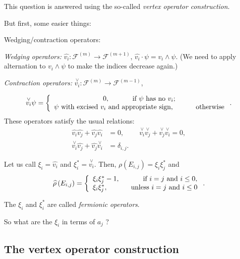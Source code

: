 \documentclass
[numbers=enddot,12pt,final,onecolumn,german,notitlepage]{scrartcl}%
\theoremstyle{definition}
\begin{document}
This question is answered using the so-called \textit{vertex operator
construction}.

But first, some easier things:

Wedging/contraction operators:

\textit{Wedging operators: }$\widehat{v_{i}}:\mathcal{F}^{\left(  m\right)
}\rightarrow\mathcal{F}^{\left(  m+1\right)  }$, $\widehat{v_{i}}\cdot
\psi=v_{i}\wedge\psi$. (We need to apply alternation to $v_{i}\wedge\psi$ to
make the indices decrease again.)

\textit{Contraction operators:} $\overset{\vee}{v_{i}}:\mathcal{F}^{\left(
m\right)  }\rightarrow\mathcal{F}^{\left(  m-1\right)  }$,%

\[
\overset{\vee}{v_{i}}\psi=\left\{
\begin{array}
[c]{c}%
0,\ \ \ \ \ \ \ \ \ \ \text{if }\psi\text{ has no }v_{i};\\
\psi\text{ with excised }v_{i}\text{ and appropriate sign,}%
\ \ \ \ \ \ \ \ \ \ \text{otherwise}%
\end{array}
\right.  .
\]
These operators satisfy the usual relations:%
\begin{align*}
\widehat{v_{i}}\widehat{v_{j}}+\widehat{v_{j}}\widehat{v_{i}}  &
=0,\ \ \ \ \ \ \ \ \ \ \overset{\vee}{v_{i}}\overset{\vee}{v_{j}%
}+\overset{\vee}{v_{j}}\overset{\vee}{v_{i}}=0,\\
\overset{\vee}{v_{i}}\widehat{v_{j}}+\widehat{v_{j}}\overset{\vee}{v_{i}}  &
=\delta_{i,j}.
\end{align*}


Let us call $\xi_{i}=\widehat{v_{i}}$ and $\xi_{i}^{\ast}=\overset{\vee
}{v_{i}}$. Then, $\rho\left(  E_{i,j}\right)  =\xi_{i}\xi_{j}^{\ast}$ and
\[
\widehat{\rho}\left(  E_{i,j}\right)  =\left\{
\begin{array}
[c]{c}%
\xi_{i}\xi_{j}^{\ast}-1,\ \ \ \ \ \ \ \ \ \ \text{if }i=j\text{ and }i\leq0,\\
\xi_{i}\xi_{j}^{\ast},\ \ \ \ \ \ \ \ \ \ \text{unless }i=j\text{ and }i\leq0
\end{array}
\right.  .
\]


The $\xi_{i}$ and $\xi_{i}^{\ast}$ are called \textit{fermionic operators}.

So what are the $\xi_{i}$ in terms of $a_{j}$ ?

\subsection{The vertex operator construction}
\end{document}
